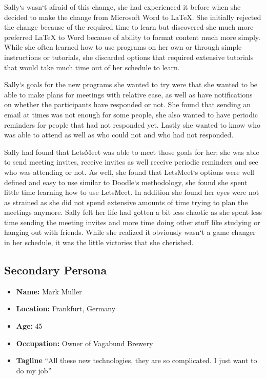 \documentclass{sigchi}
\begin{document}
		Sally`s wasn`t afraid of this change, she had experienced it before when she decided to make the change from Microsoft Word to LaTeX. She initially rejected the change because of the required time to learn but discovered she much more preferred LaTeX to Word because of ability to format content much more simply. While she often learned how to use programs on her own or through simple instructions or tutorials, she discarded options that required extensive tutorials that would take much time out of her schedule to learn.

		Sally`s goals for the new programs she wanted to try were that she wanted to be able to make plans for meetings with relative ease, as well as have notifications on whether the participants have responded or not. She found that sending an email at times was not enough for some people, she also wanted to have periodic reminders for people that had not responded yet. Lastly she wanted to know who was able to attend as well as who could not and who had not responded.

		Sally had found that LetsMeet was able to meet those goals for her; she was able to send meeting invites, receive invites as well receive periodic reminders and see who was attending or not. As well, she found that LetsMeet`s options were well defined and easy to use similar to Doodle`s methodology, she found she spent little time learning how to use LetsMeet. In addition she found her eyes were not as strained as she did not spend extensive amounts of time trying to plan the meetings anymore. Sally felt her life had gotten a bit less chaotic as she spent less time sending the meeting invites and more time doing other stuff like studying or hanging out with friends. While she realized it obviously wasn`t a game changer in her schedule, it was the little victories that she cherished.

\subsection{Secondary Persona}
\begin{itemize}
	\item \textbf{Name:} Mark Muller
	\item \textbf{Location:} Frankfurt, Germany
	\item \textbf{Age:} 45 
	\item \textbf{Occupation:} Owner of Vagabund Brewery
	\item \textbf{Tagline} ``All these new technologies, they are so complicated. I just want to do my job''
\end{itemize}
\end{document}
